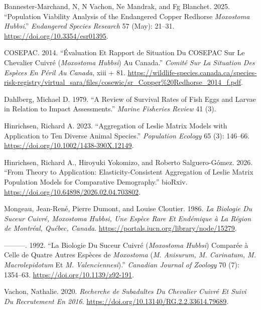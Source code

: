 \documentclass[9pt,twocolumn,twoside,]{pnas-new}
\newlength{\cslhangindent}
\newenvironment{CSLReferences}[2] %
 {\begin{list}{}{%
  \setlength{\itemindent}{0pt}
  \setlength{\leftmargin}{0pt}
  \setlength{\parsep}{0pt}
  \ifodd #1
   \setlength{\leftmargin}{\cslhangindent}
   \setlength{\itemindent}{-1\cslhangindent}
  \fi
  \setlength{\itemsep}{#2\baselineskip}}}
 {\end{list}}
\begin{document}
\label{refs}
\begin{CSLReferences}{1}{0}
Bannester-Marchand, N, N Vachon, Ne Mandrak, and Fg Blanchet. 2025.
{``Population Viability Analysis of the Endangered Copper Redhorse
\emph{{Moxostoma} Hubbsi}.''} \emph{Endangered Species Research} 57
(May): 21--31. \url{https://doi.org/10.3354/esr01395}.

COSEPAC. 2014. {``Évaluation Et {Rapport} de Situation Du {COSEPAC} Sur
Le Chevalier Cuivré (\emph{{Moxostoma} Hubbsi}) Au {Canada}.''}
\emph{Comité Sur La Situation Des Espèces En Péril Au Canada}, xiii +
81.
\url{https://wildlife-species.canada.ca/species-risk-registry/virtual_sara/files/cosewic/sr_Copper\%20Redhorse_2014_f.pdf}.

Dahlberg, Michael D. 1979. {``A Review of Survival Rates of Fish Eggs
and Larvae in Relation to Impact Assessments.''} \emph{Marine Fisheries
Review} 41 (3).

Hinrichsen, Richard A. 2023. {``Aggregation of {Leslie} Matrix Models
with Application to Ten Diverse Animal Species.''} \emph{Population
Ecology} 65 (3): 146--66. \url{https://doi.org/10.1002/1438-390X.12149}.

Hinrichsen, Richard A., Hiroyuki Yokomizo, and Roberto Salguero-Gómez.
2026. {``From Theory to Application: {Elasticity}-Consistent Aggregation
of {Leslie} Matrix Population Models for Comparative Demography.''}
bioRxiv. \url{https://doi.org/10.64898/2026.02.04.703802}.

Mongeau, Jean-René, Pierre Dumont, and Louise Cloutier. 1986. \emph{La
Biologie Du {Suceur} Cuivré, \emph{{Moxostoma} Hubbsi}, Une Espèce Rare
Et Endémique à La Région de {Montréal}, {Québec}, {Canada}}.
\url{https://portals.iucn.org/library/node/15279}.

---------. 1992. {``La Biologie Du Suceur Cuivré (\emph{{Moxostoma}
Hubbsi}) Comparée à Celle de Quatre Autres Espèces de \emph{Moxostoma}
(\emph{{M}. Anisurum, {M}. Carinatum, {M}. Macrolepidotum} Et \emph{{M}.
Valenciennesi}).''} \emph{Canadian Journal of Zoology} 70 (7): 1354--63.
\url{https://doi.org/10.1139/z92-191}.

Vachon, Nathalie. 2020. \emph{Recherche de Subadultes Du Chevalier
Cuivré Et Suivi Du Recrutement En 2016}.
\url{https://doi.org/10.13140/RG.2.2.33614.79689}.


\end{CSLReferences}
\end{document}
